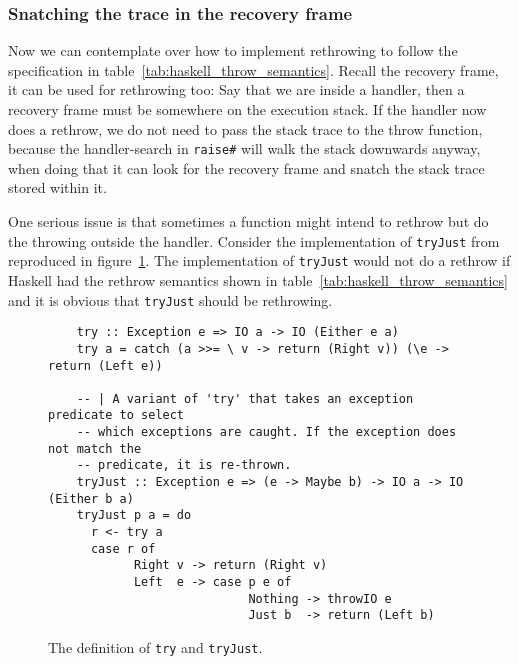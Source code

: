 \subsubsection{Snatching the trace in the recovery frame}

Now we can contemplate over how to implement rethrowing to follow the
specification in table~\ref{tab:haskell_throw_semantics}. Recall the
recovery frame, it can be used for rethrowing too: Say that we are
inside a handler, then a recovery frame must be somewhere on the
execution stack. If the handler now does a rethrow, we do not need to pass
the stack trace to the throw function, because the handler-search in
\texttt{raise\#} will walk the stack downwards anyway, when doing that
it can look for the recovery frame and snatch the stack trace stored
within it.

One serious issue is that sometimes a function might intend to rethrow
but do the throwing outside the handler. Consider the implementation of
\texttt{tryJust} from \cite{hackage_base_control_exception_base_tryJust}
reproduced in figure~\ref{fig:try_just}. The implementation of \texttt{tryJust} would
not do a rethrow if Haskell had the rethrow semantics shown in
table~\ref{tab:haskell_throw_semantics} and it is obvious that
\texttt{tryJust} should be rethrowing.

\begin{figure}
\begin{mdframed}
  \begin{verbatim}
    try :: Exception e => IO a -> IO (Either e a)
    try a = catch (a >>= \ v -> return (Right v)) (\e -> return (Left e))

    -- | A variant of 'try' that takes an exception predicate to select
    -- which exceptions are caught. If the exception does not match the
    -- predicate, it is re-thrown.
    tryJust :: Exception e => (e -> Maybe b) -> IO a -> IO (Either b a)
    tryJust p a = do
      r <- try a
      case r of
            Right v -> return (Right v)
            Left  e -> case p e of
                            Nothing -> throwIO e
                            Just b  -> return (Left b)
  \end{verbatim}
  \caption{The definition of \texttt{try} and \texttt{tryJust}.}
  \label{fig:try_just}
\end{mdframed}
\end{figure}

